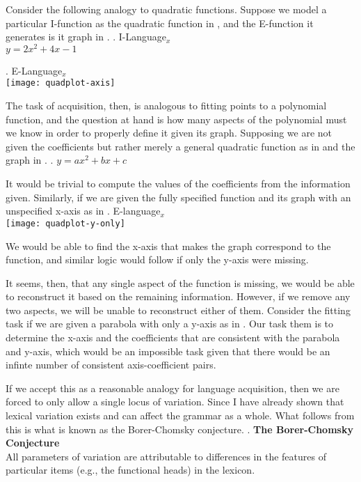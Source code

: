 \documentclass[MilwayThesis]{subfiles}
\begin{document}
Consider the following analogy to quadratic functions.
Suppose we model a particular I-function as the quadratic function in \Next, and the E-function it generates is it graph in \NNext.
\ex. I-Language$_x$\\
$y = 2x^2 + 4x-1$

\ex. E-Language$_x$\\
\texttt{[image: quadplot-axis]}

The task of acquisition, then, is analogous to fitting points to a polynomial function, and the question at hand is how many aspects of the polynomial must we know in order to properly define it given its graph.
Supposing we are not given the coefficients but rather merely a general quadratic function as in \Next and the graph in \Last.
\ex. $y = ax^2 + bx + c$

It would be trivial to compute the values of the coefficients from the information given.
Similarly, if we are given the fully specified function and its graph with an unspecified x-axis as in \Next
\ex. E-language$_x$\\ 
\texttt{[image: quadplot-y-only]}

We would be able to find the x-axis that makes the graph correspond to the function, and similar logic would follow if only the y-axis were missing.

It seems, then, that any single aspect of the function is missing, we would be able to reconstruct it based on the remaining information.
However, if we remove any two aspects, we will be unable to reconstruct either of them. 
Consider the fitting task if we are given a parabola with only a y-axis as in \Last.
Our task them is to determine the x-axis and the coefficients that are consistent with the parabola and y-axis, which would be an impossible task given that there would be an infinte number of consistent axis-coefficient pairs.

If we accept this as a reasonable analogy for language acquisition, then we are forced to only allow a single locus of variation.
Since I have already shown that lexical variation exists and can affect the grammar as a whole.
What follows from this is what is known as the Borer-Chomsky conjecture.
\ex. \textbf{The Borer-Chomsky Conjecture} \parencite{baker2008microparameter}\\
All parameters of variation are attributable to differences in the features of particular items (e.g., the functional heads) in the lexicon.
\end{document}
